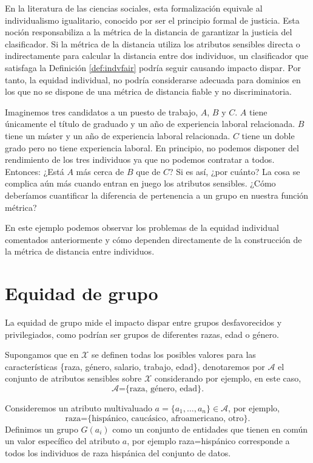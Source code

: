 \documentclass[oneside,openright,titlepage,numbers=noenddot,openany,headinclude,footinclude=true,
cleardoublepage=empty,abstractoff,BCOR=5mm,paper=a4,fontsize=12pt,main=spanish]{scrreprt}
\begin{document}
En la literatura de las ciencias sociales, esta formalización
equivale al individualismo igualitario, conocido por ser el principio formal de justicia. Esta noción responsabiliza a la métrica de la distancia de garantizar la justicia del clasificador. Si la métrica de la distancia utiliza los atributos sensibles directa o indirectamente para calcular la distancia entre dos individuos, un clasificador que satisfaga la Definición \ref{def:indvfair} podría seguir causando impacto dispar. Por tanto, la equidad individual, no podría considerarse adecuada para dominios en los que no se dispone de una métrica de distancia fiable y no discriminatoria.

\begin{example}
Imaginemos tres candidatos a un puesto de trabajo, $A$, $B$ y $C$. $A$ tiene únicamente el título de graduado y un año de experiencia laboral relacionada. $B$ tiene un máster y un año de experiencia laboral relacionada. $C$ tiene un doble grado pero no tiene experiencia laboral. En principio, no podemos disponer del rendimiento de los tres individuos ya que no podemos contratar a todos. Entonces: ¿Está $A$ más cerca de $B$ que de $C$? Si es así, ¿por cuánto? La cosa se complica aún más cuando entran en juego los atributos sensibles. ¿Cómo deberíamos cuantificar la diferencia de pertenencia a un grupo en nuestra función métrica?

En este ejemplo podemos observar los problemas de la equidad individual comentados anteriormente y cómo dependen directamente de la construcción de la métrica de distancia entre individuos.
\end{example}

\section{Equidad de grupo}

La equidad de grupo mide el impacto dispar entre grupos desfavorecidos y privilegiados, como podrían ser grupos de diferentes razas, edad o género.

Supongamos que en $\mathcal{X}$ se definen todas los posibles valores para las características \{raza, género, salario, trabajo, edad\}, denotaremos por $\mathcal{A}$ el conjunto de atributos sensibles sobre $\mathcal{X}$ considerando por ejemplo, en este caso, $$\mathcal{A}\text{=\{raza, género, edad\}}.$$

Consideremos un atributo multivaluado $a = \{a_1,\dots,a_n\} \in \mathcal{A}$, por ejemplo, $$\text{raza=\{hispánico, caucásico, afroamericano, otro\}}.$$ Definimos un grupo $G(a_i)$
como un conjunto de entidades que tienen en común un valor específico
del atributo $a$, por ejemplo raza=hispánico corresponde a todos los individuos de raza hispánica del
conjunto de datos.
\end{document}
